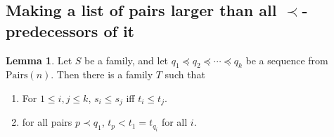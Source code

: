 \documentclass[12pt]{article}
\theoremstyle{definition}
\newtheorem{lemma}[theorem]{Lemma}
\newcommand{\Pairs}{\mbox{Pairs}}
\begin{document}
 
\subsection{Making a list of pairs larger than all $\prec$-predecessors
of it}

\begin{lemma}
Let $S$ be a family, and let $q_1\preceq q_2 \preceq \cdots \preceq q_k$ be a sequence 
from $\Pairs(n)$.  
Then there is a family $T$ such that
\begin{enumerate} 
    \item For $1\leq i,j \leq k$, $s_i \leq s_j$ iff $t_i \leq t_j$.
    \label{competitor1}
    \item for all 
pairs $p \prec q_1$, 
$t_{p}  < t_1 = t_{q_i}$ for all $i$.
\label{competitor2}
\end{enumerate}
\label{lemma-competitor}
\end{lemma}
 
\end{document}
